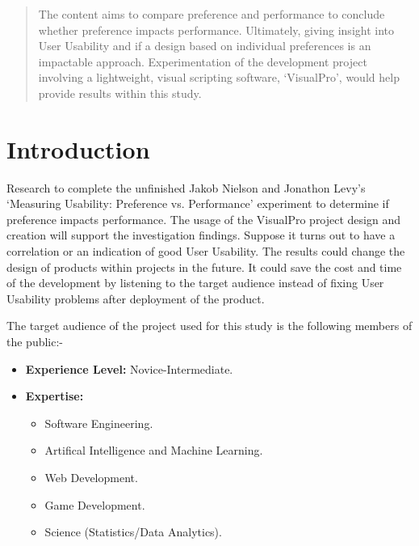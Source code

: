\documentclass[a0,portrait]{a0poster}
\begin{document}
\begin{multicols}{2} %


\color{ku} %

\begin{abstract}
    The content aims to compare preference and performance to conclude whether preference impacts performance. Ultimately, giving insight into User Usability and if a design based on individual preferences is an impactable approach. Experimentation of the development project involving a lightweight, visual scripting software, `VisualPro', would help provide results within this study.
\end{abstract}


\color{DarkRed} %

\section*{Introduction}
    Research to complete the unfinished Jakob Nielson and Jonathon Levy's~\cite{nielsen_measuring_1994} `Measuring Usability: Preference vs. Performance' experiment to determine if preference impacts performance. The usage of the VisualPro project design and creation will support the investigation findings. Suppose it turns out to have a correlation or an indication of good User Usability. The results could change the design of products within projects in the future. It could save the cost and time of the development by listening to the target audience instead of fixing User Usability problems after deployment of the product.

    The target audience of the project used for this study is the following members of the public:-
    \begin{itemize}
        \item  \textbf{Experience Level:} Novice-Intermediate.
        \item \textbf{Expertise:}
        \begin{itemize}
            \item Software Engineering.
            \item Artifical Intelligence and Machine Learning.
            \item Web Development.
            \item Game Development.
            \item Science (Statistics/Data Analytics).
        \end{itemize}
    \end{itemize}


\end{multicols}
\end{document}
